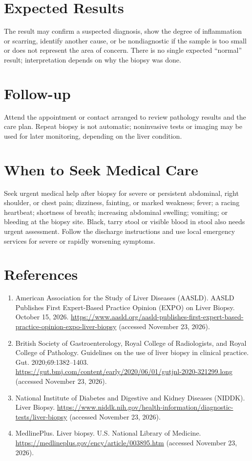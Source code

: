 \section*{Expected Results}
The result may confirm a suspected diagnosis, show the degree of inflammation or scarring, identify another cause, or be nondiagnostic if the sample is too small or does not represent the area of concern. There is no single expected “normal” result; interpretation depends on why the biopsy was done.

\section*{Follow-up}
Attend the appointment or contact arranged to review pathology results and the care plan. Repeat biopsy is not automatic; noninvasive tests or imaging may be used for later monitoring, depending on the liver condition.

\section*{When to Seek Medical Care}
Seek urgent medical help after biopsy for severe or persistent abdominal, right shoulder, or chest pain; dizziness, fainting, or marked weakness; fever; a racing heartbeat; shortness of breath; increasing abdominal swelling; vomiting; or bleeding at the biopsy site. Black, tarry stool or visible blood in stool also needs urgent assessment. Follow the discharge instructions and use local emergency services for severe or rapidly worsening symptoms.

\section*{References}
\begin{enumerate}
  \item American Association for the Study of Liver Diseases (AASLD). AASLD Publishes First Expert-Based Practice Opinion (EXPO) on Liver Biopsy. October 15, 2026. \url{https://www.aasld.org/aasld-publishes-first-expert-based-practice-opinion-expo-liver-biopsy} (accessed November 23, 2026).
  \item British Society of Gastroenterology, Royal College of Radiologists, and Royal College of Pathology. Guidelines on the use of liver biopsy in clinical practice. Gut. 2020;69:1382--1403. \url{https://gut.bmj.com/content/early/2020/06/01/gutjnl-2020-321299.long} (accessed November 23, 2026).
  \item National Institute of Diabetes and Digestive and Kidney Diseases (NIDDK). Liver Biopsy. \url{https://www.niddk.nih.gov/health-information/diagnostic-tests/liver-biopsy} (accessed November 23, 2026).
  \item MedlinePlus. Liver biopsy. U.S. National Library of Medicine. \url{https://medlineplus.gov/ency/article/003895.htm} (accessed November 23, 2026).
\end{enumerate}

\clearpage
